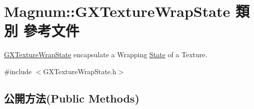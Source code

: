 \hypertarget{class_magnum_1_1_g_x_texture_wrap_state}{}\section{Magnum\+:\+:G\+X\+Texture\+Wrap\+State 類別 參考文件}
\label{class_magnum_1_1_g_x_texture_wrap_state}


\hyperlink{class_magnum_1_1_g_x_texture_wrap_state}{G\+X\+Texture\+Wrap\+State} encapsulate a Wrapping \hyperlink{class_magnum_1_1_state}{State} of a Texture.  




{\ttfamily \#include $<$G\+X\+Texture\+Wrap\+State.\+h$>$}

\subsection*{公開方法(Public Methods)}

